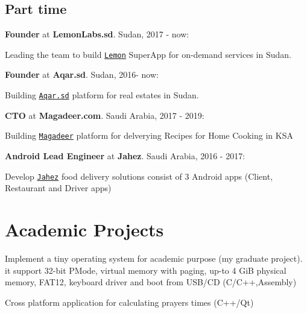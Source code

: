 \documentclass[letterpaper]{article}
\renewenvironment{itemize}{
  \begin{list}{}{
    \setlength{\leftmargin}{1.5em}
  }
}{
  \end{list}
}
\begin{document}
\subsection*{Part time}
\begin{itemize}

\item \textbf{Founder} at \textbf{LemonLabs.sd}. Sudan, 2017 - now: 
\begin{itemize}
\item Leading the team to build \href{https://play.google.com/store/apps/details?id=sd.lemon}{\tt Lemon} SuperApp for on-demand services in Sudan. 
\end{itemize}

\item \textbf{Founder} at \textbf{Aqar.sd}. Sudan, 2016- now:
\begin{itemize}
\item Building \href{https://play.google.com/store/apps/details?id=sd.aqar}{\tt Aqar.sd} platform for real estates in Sudan. 
\end{itemize}

\item \textbf{CTO} at \textbf{Magadeer.com}. Saudi Arabia, 2017 - 2019:
\begin{itemize}
\item Building \href{https://play.google.com/store/apps/details?id=com.magadeer}{\tt Magadeer} platform for delverying Recipes for Home Cooking in KSA
\end{itemize}


\item \textbf{Android Lead Engineer} at \textbf{Jahez}. Saudi Arabia, 2016 - 2017:
\begin{itemize}
\item Develop \href{https://play.google.com/store/apps/details?id=net.jahez}{\tt Jahez} food delivery solutions consist of 3 Android apps (Client, Restaurant and Driver apps) 
\end{itemize}

\end{itemize}

\section*{Academic Projects}
\begin{itemize}
\item Implement a tiny operating system for academic purpose (my graduate project). it support 32-bit PMode, virtual memory with paging, up-to 4 GiB physical memory, FAT12, keyboard driver and boot from USB/CD (C/C++,Assembly)
\item Cross platform application for calculating prayers times (C++/Qt)
\end{itemize}
\end{document}
